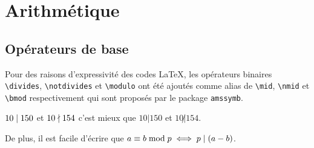 \documentclass[12pt,a4paper]{article}
\begin{document}
\section{Arithmétique}

\subsection{Opérateurs de base}

Pour des raisons d'expressivité des codes \LaTeX{}, les opérateurs binaires \verb+\divides+, \verb+\notdivides+ et \verb+\modulo+ ont été ajoutés comme alias de \verb+\mid+, \verb+\nmid+ et \verb+\bmod+ respectivement qui sont proposés par le package \verb+amssymb+.

\begin{tcblisting}{}
$10 \divides 150$ et $10 \notdivides 154$ c'est mieux que $10 | 150$ et $10 \not| 154$.

De plus, il est facile d'écrire que $a \equiv b \modulo p \iff p \divides (a - b)$.
\end{tcblisting}
\end{document}

